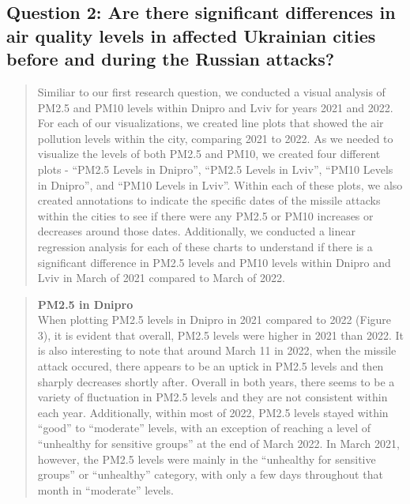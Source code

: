 \documentclass[
  12pt,
]{article}
\begin{document}
\newpage

\hypertarget{question-2-are-there-significant-differences-in-air-quality-levels-in-affected-ukrainian-cities-before-and-during-the-russian-attacks}{%
\subsection{Question 2: Are there significant differences in air quality
levels in affected Ukrainian cities before and during the Russian
attacks?}\label{question-2-are-there-significant-differences-in-air-quality-levels-in-affected-ukrainian-cities-before-and-during-the-russian-attacks}}

\begin{quote}
Similiar to our first research question, we conducted a visual analysis
of PM2.5 and PM10 levels within Dnipro and Lviv for years 2021 and 2022.
For each of our visualizations, we created line plots that showed the
air pollution levels within the city, comparing 2021 to 2022. As we
needed to visualize the levels of both PM2.5 and PM10, we created four
different plots - ``PM2.5 Levels in Dnipro'', ``PM2.5 Levels in Lviv'',
``PM10 Levels in Dnipro'', and ``PM10 Levels in Lviv''. Within each of
these plots, we also created annotations to indicate the specific dates
of the missile attacks within the cities to see if there were any PM2.5
or PM10 increases or decreases around those dates. Additionally, we
conducted a linear regression analysis for each of these charts to
understand if there is a significant difference in PM2.5 levels and PM10
levels within Dnipro and Lviv in March of 2021 compared to March of
2022.\\
\end{quote}

\begin{quote}
\textbf{PM2.5 in Dnipro}\\
When plotting PM2.5 levels in Dnipro in 2021 compared to 2022 (Figure
3), it is evident that overall, PM2.5 levels were higher in 2021 than
2022. It is also interesting to note that around March 11 in 2022, when
the missile attack occured, there appears to be an uptick in PM2.5
levels and then sharply decreases shortly after. Overall in both years,
there seems to be a variety of fluctuation in PM2.5 levels and they are
not consistent within each year. Additionally, within most of 2022,
PM2.5 levels stayed within ``good'' to ``moderate'' levels, with an
exception of reaching a level of ``unhealthy for sensitive groups'' at
the end of March 2022. In March 2021, however, the PM2.5 levels were
mainly in the ``unhealthy for sensitive groups'' or ``unhealthy''
category, with only a few days throughout that month in ``moderate''
levels.
\end{quote}
\end{document}
